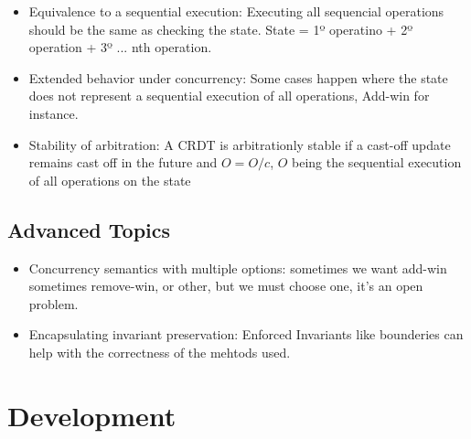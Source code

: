 \documentclass{article}
\begin{document}
\begin{itemize}
\begin{itemize}
        \item Equivalence to a sequential execution: Executing all sequencial operations should be the same as checking the state. State = 1º operatino + 2º operation + 3º ... nth operation.
        \item Extended behavior under concurrency: Some cases happen where the state does not represent a sequential execution of all operations, Add-win for instance.
        \item Stability of arbitration: A CRDT is arbitrationly stable if a cast-off update remains cast off in the future and $O = O / {c}$, $O$ being the sequential execution of all operations on the state
    \end{itemize}
\end{itemize}

\subsection{Advanced Topics}
\begin{itemize}
    \item Concurrency semantics with multiple options: sometimes we want add-win sometimes remove-win, or other, but we must choose one, it's an open problem.
    \item  Encapsulating invariant preservation: Enforced Invariants like bounderies can help with the correctness of the mehtods used.
\end{itemize}
\section{Development}
\end{document}
